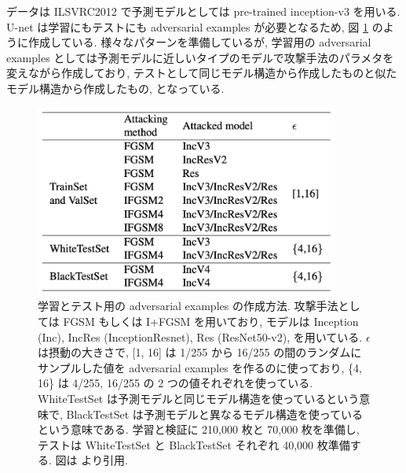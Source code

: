データは ILSVRC2012 で予測モデルとしては pre-trained inception-v3 を用いる.
U-net は学習にもテストにも adversarial examples が必要となるため, 図 \ref{fig:defense-against-make-adv-examples} のように作成している.
様々なパターンを準備しているが, 学習用の adversarial examples としては予測モデルに近しいタイプのモデルで攻撃手法のパラメタを変えながら作成しており, テストとして同じモデル構造から作成したものと似たモデル構造から作成したもの, となっている.
%
\begin{figure}[htbp]
\begin{center}
\includegraphics[width=10.0cm]{figures/defense-against-make-adv-examples.pdf}
\end{center}
\caption{
学習とテスト用の adversarial examples の作成方法.
攻撃手法としては FGSM もしくは I+FGSM を用いており, モデルは Inception (Inc), IncRes (InceptionResnet), Res (ResNet50-v2), を用いている.
$\epsilon$ は摂動の大きさで, [1, 16] は 1/255 から 16/255 の間のランダムにサンプルした値を adversarial examples を作るのに使っており, \{4, 16\} は 4/255, 16/255 の 2 つの値それぞれを使っている.
WhiteTestSet は予測モデルと同じモデル構造を使っているという意味で, BlackTestSet は予測モデルと異なるモデル構造を使っているという意味である.
学習と検証に 210,000 枚と 70,000 枚を準備し, テストは WhiteTestSet と BlackTestSet それぞれ 40,000 枚準備する.
図は \cite{liao2018defense} より引用.
}
\label{fig:defense-against-make-adv-examples}
\end{figure}

